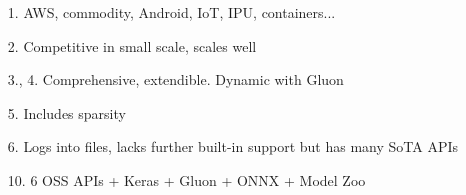 \documentclass[hyperref={pdfpagelabels=false}]{beamer}
\begin{document}
\begin{frame}
\begin{columns}[t]
\begin{tikzpicture}
         \end{tikzpicture}
         \begin{itemize}
         \item[\scriptsize{\textcolor{visiblered}{1.}}] \scriptsize{AWS, commodity, Android, IoT, IPU, containers...\cite{mxnet-wiki}\cite{poplar-overview}}
         \item[\scriptsize{\textcolor{visiblered}{2.}}] \scriptsize{Competitive in small scale\cite{chainer-benchmarks}, scales well\cite{mxnet-wiki}}
         \item[\scriptsize{\textcolor{visiblegreen}{3., 4.}}] \scriptsize{Comprehensive, extendible. Dynamic with Gluon\cite{dl4j-review}}
         \item[\scriptsize{\textcolor{visiblegreen}{5.}}] \scriptsize{Includes sparsity}
         \item[\scriptsize{\textcolor{visiblegreen}{6.}}] \scriptsize{Logs into files, lacks further built-in support but has many SoTA APIs\cite{mxnet-plot}}
         \item[\scriptsize{\textcolor{visibleblue}{10.}}] \scriptsize{6 OSS APIs + Keras + Gluon + ONNX + Model Zoo}
         \end{itemize}
          \end{columns}
     \end{frame}

         
\end{document}
